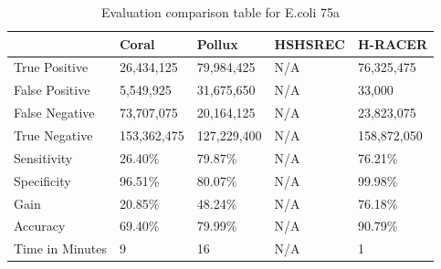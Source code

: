 \documentclass{llncs}
\newcommand{\TBstrut}{{\rule{0pt}{2ex}}{\rule[2ex]{0pt}{0pt}}} %
\begin{document}
\begin{longtable}{|m{33mm}|m{20mm}|m{20mm}|m{20mm}|m{20mm}|}
	    \caption{\label{tab:eval-3}Evaluation comparison table for E.coli 75a}\\
        \hline
           & Coral & Pollux & HSHSREC & H-RACER\cellcolor{DarkGray} \TBstrut\\ %
        \hline
           True Positive & 26,434,125 & 79,984,425 & N/A & 76,325,475\cellcolor{LightGray} \TBstrut\\ %
        \hline
           False Positive & 5,549,925 & 31,675,650 & N/A & 33,000\cellcolor{LightGray} \TBstrut\\ %
        \hline
           False Negative & 73,707,075 & 20,164,125 & N/A & 23,823,075\cellcolor{LightGray} \TBstrut\\ %
        \hline
           True Negative & 153,362,475 & 127,229,400 & N/A & 158,872,050\cellcolor{LightGray} \TBstrut\\ %
        \hline
           Sensitivity & 26.40\% & 79.87\% & N/A & 76.21\%\cellcolor{LightGray} \TBstrut\\ %
        \hline
           Specificity & 96.51\% & 80.07\% & N/A & 99.98\%\cellcolor{LightGray} \TBstrut\\ %
        \hline
           Gain & 20.85\% & 48.24\% & N/A & 76.18\%\cellcolor{LightGray} \TBstrut\\ %
        \hline
           Accuracy & 69.40\% & 79.99\% & N/A & 90.79\%\cellcolor{LightGray} \TBstrut\\ %
        \hline
           Time in Minutes& 9 & 16 & N/A & 1\cellcolor{LightGray} \TBstrut\\ %
        \hline
\end{longtable}
\end{document}
